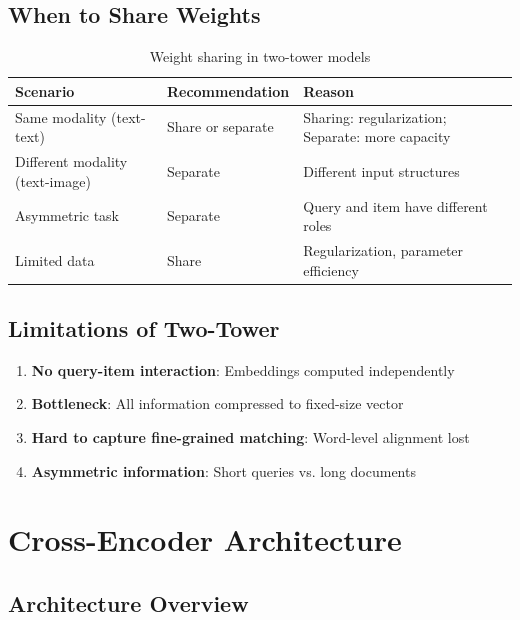 \subsection{When to Share Weights}

\begin{table}[H]
\centering
\caption{Weight sharing in two-tower models}
\begin{tabularx}{\textwidth}{lXX}
\toprule
\textbf{Scenario} & \textbf{Recommendation} & \textbf{Reason} \\
\midrule
Same modality (text-text) & Share or separate & Sharing: regularization; Separate: more capacity \\
Different modality (text-image) & Separate & Different input structures \\
Asymmetric task & Separate & Query and item have different roles \\
Limited data & Share & Regularization, parameter efficiency \\
\bottomrule
\end{tabularx}
\end{table}

\subsection{Limitations of Two-Tower}

\begin{enumerate}
    \item \textbf{No query-item interaction}: Embeddings computed independently
    \item \textbf{Bottleneck}: All information compressed to fixed-size vector
    \item \textbf{Hard to capture fine-grained matching}: Word-level alignment lost
    \item \textbf{Asymmetric information}: Short queries vs. long documents
\end{enumerate}

\section{Cross-Encoder Architecture}
\label{sec:cross_encoder}

\subsection{Architecture Overview}

